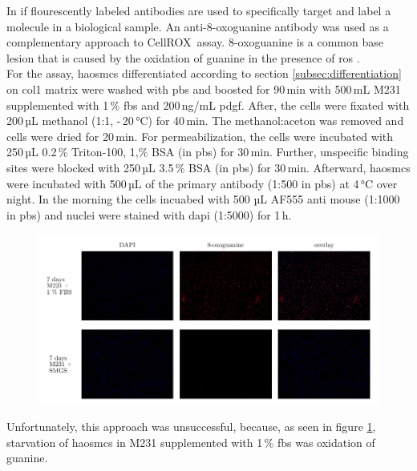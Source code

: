 In \ac{if} flourescently labeled antibodies are used to specifically target and label a molecule in a biological sample. An anti-8-oxoguanine antibody was used as a complementary approach to CellROX\texttrademark~assay. 8-oxoguanine is a common base lesion that is caused by the oxidation of guanine in the presence of \ac{ros} \cite{leon8OxoguanineAccumulationMitochondrial2016}.\\
For the assay, \acp{haosmc} differentiated according to section \ref{subsec:differentiation} on \ac{col1} matrix were washed with \ac{pbs} and boosted for 90\,min with 500\,mL \ac{M231} supplemented with 1\,\% \ac{fbs} and 200\,ng/mL \ac{pdgf}. After, the cells were fixated with 200\,µL methanol (1:1, -\,20\,°C) for 40\,min. The methanol:aceton was removed and cells were dried for 20\,min. For permeabilization, the cells were incubated with 250\,µL 0.2\,\% Triton-100, 1,\% BSA (in \ac{pbs}) for 30\,min. Further, unspecific binding sites were blocked with 250\,µL 3.5\,\% BSA (in \ac{pbs}) for 30\,min. Afterward, \acp{haosmc} were incubated with 500\,µL of the primary antibody (1:500 in \ac{pbs}) at 4\,°C over night. In the morning the cells incuabed with 500 µL AF555 anti mouse (1:1000 in \ac{pbs}) and nuclei were stained with \ac{dapi} (1:5000) for 1\,h.

\begin{figure}[H]
    \capstart
    \centering
    \includegraphics{Abbildung/8oxoG.pdf}

    \begin{minipage}{\captionwidth}
        \caption[antibody]{\newline
        }
        \label{fig:antibody}
    \end{minipage}
\end{figure}

Unfortunately, this approach was unsuccessful, because, as seen in figure \ref{fig:antibody}, starvation of \acp{haosmc} in \ac{M231} supplemented with 1\,\% \ac{fbs} was oxidation of guanine.
